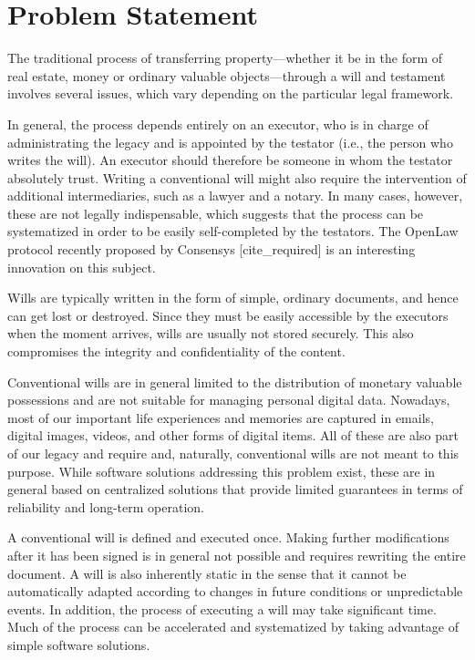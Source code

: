 \section{Problem Statement} %
\label{sec:problem_statement}
The traditional process of transferring property---whether it be in the form of real estate, money or ordinary valuable objects---through a will and testament involves several issues, which vary depending on the particular legal framework. 

In general, the process depends entirely on an executor, who is in charge of administrating the legacy and is appointed by the testator (i.e., the person who writes the will). An executor should therefore be someone in whom the testator absolutely trust.  Writing a conventional will might also require the intervention of additional  intermediaries, such as a lawyer and a notary. In many cases, however, these are not legally indispensable, which suggests that the process can be systematized in order to be easily self-completed by the testators. The OpenLaw protocol recently proposed by Consensys [cite_required] is an interesting innovation on this subject. 

Wills are typically written in the form of simple, ordinary documents, and hence can get lost or destroyed. Since they must be easily accessible by the executors when the moment arrives, wills are usually not stored securely. This also compromises the integrity and confidentiality of the content.
  
Conventional wills are in general limited to the distribution of monetary valuable possessions and are not suitable for managing personal digital data. Nowadays, most of our important life experiences and memories are captured in emails, digital images, videos,  and other forms of digital items. All of these are also part of our legacy and require  and, naturally, conventional wills are not meant to this purpose. While software solutions addressing this problem exist, these are in general based on centralized solutions that provide limited guarantees in terms of reliability and long-term operation.

A conventional will is defined and executed once. Making further modifications after it has been signed is in general not possible and requires rewriting the entire document. A will is also inherently static in the sense that it cannot be automatically adapted according to changes in future conditions or unpredictable events. In addition, the process of executing a will may take significant time. Much of the process can be accelerated and systematized by taking advantage of simple software solutions. 

